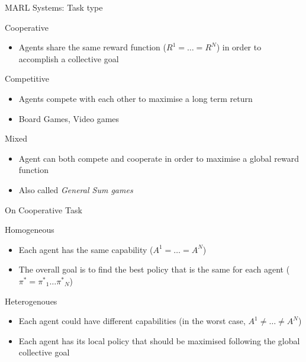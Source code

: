 \documentclass[presentation]{beamer}\mode<presentation>{\usetheme{AMSBolognaFC}}
\begin{document}
\begin{frame}{MARL Systems: Task type}
	\begin{alertblock}{Cooperative}
		\begin{itemize}
			\item Agents share the same reward function ($R^1 = \dots = R^N$) in order to accomplish a collective goal
		\end{itemize}
	\end{alertblock}
	\begin{exampleblock}{Competitive}
		\begin{itemize}
			\item Agents compete with each other to maximise a long term return
			\item Board Games, Video games
		\end{itemize}
	\end{exampleblock}
	\begin{exampleblock}{Mixed}
		\begin{itemize}
			\item Agent can both compete and cooperate in order to maximise a global reward function
			\item Also called \textit{General Sum games}
		\end{itemize}
	\end{exampleblock}
\end{frame}
\begin{frame}{On Cooperative Task}
	\begin{exampleblock}{Homogeneous}
		\begin{itemize}
			\item Each agent has the same capability ($A^1 = \dots = A^N$)
			\item The overall goal is to find the best policy that is the same for each agent ($\pi^* = {\pi^{*}}_1 \dots {\pi^{*}}_N$)
		\end{itemize}
	\end{exampleblock}
	\begin{exampleblock}{Heterogenoues}
		\begin{itemize}
			\item Each agent could have different capabilities (in the worst case, $A^1 \neq \dots \neq A^N$)
			\item Each agent has its local policy that should be maximised following the global collective goal
		\end{itemize}
	\end{exampleblock}
\end{frame}
\end{document}
